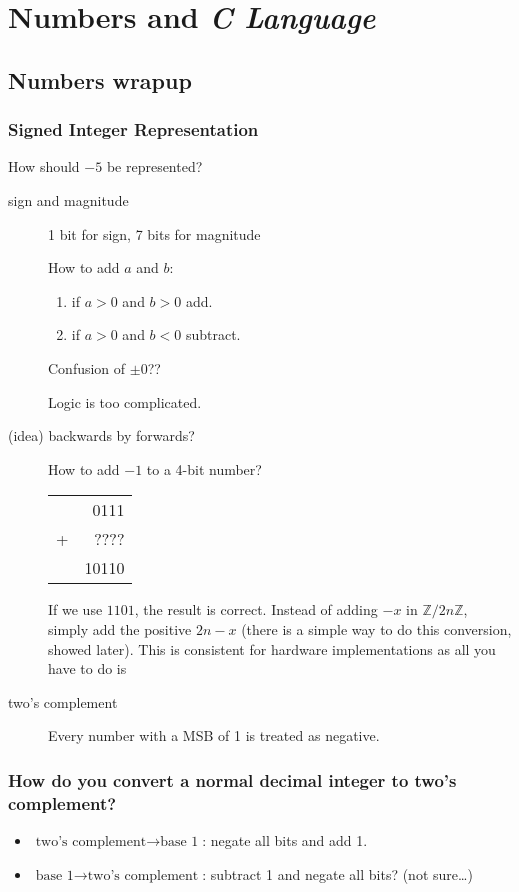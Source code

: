 \chapter{Numbers and \emph{C Language}}
\section{Numbers wrapup}
\subsection{Signed Integer Representation}
How should $-5$ be represented?
\begin{description}
	\item[sign and magnitude] 1 bit for sign, 7 bits for magnitude
	
	How to add \(a\) and \(b\):
	\begin{enumerate}
		\item if \(a > 0\) and \(b > 0\) add.
		\item if \(a > 0\) and \(b < 0\) subtract.
	\end{enumerate}
	Confusion of \(\pm 0\)??
	
	Logic is too complicated.
	\item[(idea) backwards by forwards?] How to add \(-1\) to a 4-bit number?
	
	\begin{tabular}{rr}
		& 0111 \\
		+ &???? \\ \hline
		&10110
	\end{tabular}
	
	If we use \(1101\), the result is correct. Instead of adding \(-x\) in \(\mathbb{Z}/2n\mathbb{Z}\), simply add the positive \(2n - x\) (there is a simple way to do this conversion, showed later). This is consistent for hardware implementations as all you have to do is
	
	\item[two's complement] Every number with a MSB of 1 is treated as negative.
\end{description}

\subsection{How do you convert a normal decimal integer to two's complement?}
\begin{itemize}
	\item \(\text{two's complement}\rightarrow\text{base 1}\): negate all bits and add 1.
	\item \(\text{base 1}\rightarrow\text{two's complement}\): subtract 1 and negate all bits? (not sure\ldots)
\end{itemize}

